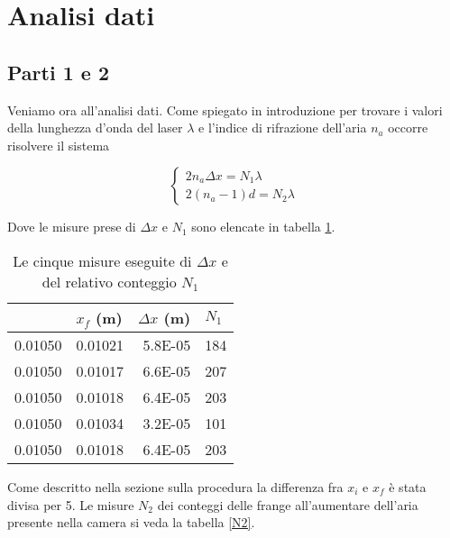 \documentclass[a4paper,11pt]{article}
\begin{document}
	\section{Analisi dati}
	
	\subsection{Parti 1 e 2}
	Veniamo ora all'analisi dati. Come spiegato in introduzione per trovare i valori della lunghezza d'onda del laser $\lambda$ e l'indice di rifrazione dell'aria $n _a$ occorre risolvere il sistema
	
	\begin{equation}
		\begin{cases}
			2n _a \Delta x = N _1 \lambda \\ 2(n_a -1)d =N_2 \lambda
		\end{cases}	
	\end{equation}
	
	Dove le misure prese di $\Delta x$ e $N _1$ sono elencate in tabella \ref{deltax}.
	
	\begin{table}[htbp]
  \centering
  \caption{Le cinque misure eseguite di $\Delta x$ e del relativo conteggio $N _1$}
    \begin{tabular}{rrrr}
    \bottomrule
    \rowcolor[rgb]{ .267,  .447,  .769} \multicolumn{1}{l}{\textcolor[rgb]{ 1,  1,  1}{\textbf{$x _i$ (m)}}} & \multicolumn{1}{l}{\textcolor[rgb]{ 1,  1,  1}{\textbf{$x _f$ (m)}}} & \multicolumn{1}{l}{\textcolor[rgb]{ 1,  1,  1}{\textbf{$\Delta x$ (m)}}} & \multicolumn{1}{l}{\textcolor[rgb]{ 1,  1,  1}{\textbf{$N _1$}}} \\
    \toprule
   \rowcolor[rgb]{ .851,  .851,  .851} 0.01050 & 0.01021 & 5.8E-05 & 184 \\
    0.01050 & 0.01017 & 6.6E-05 & 207 \\
    \rowcolor[rgb]{ .851,  .851,  .851} 0.01050 & 0.01018 & 6.4E-05 & 203 \\
    0.01050 & 0.01034 & 3.2E-05 & 101 \\
    \rowcolor[rgb]{ .851,  .851,  .851} 0.01050 & 0.01018 & 6.4E-05 & 203 \\
    \toprule
    \end{tabular}%
  \label{deltax}%
\end{table}%
	
	Come descritto nella sezione sulla procedura la differenza fra $x _i$ e $x _f$ è stata divisa per 5. Le misure $N _2$ dei conteggi delle frange all'aumentare dell'aria presente nella camera si veda la tabella \ref{N2}.
	
\end{document}
